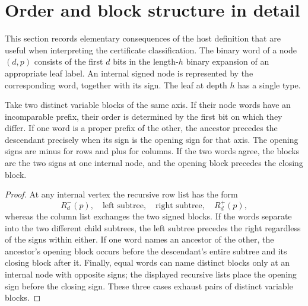 \section{Order and block structure in detail}\label{sec:structure}
This section records elementary consequences of the host definition
that are useful when interpreting the certificate classification.
The binary word of a node $(d,p)$ consists of the first $d$ bits in
the length-$h$ binary expansion of an appropriate leaf label.
An internal signed node is represented by the corresponding word,
together with its sign.  The leaf at depth $h$ has a single type.

\begin{lemma}\label{lem:wordorder}
Take two distinct variable blocks of the same axis. If their node
words have an incomparable prefix, their order is determined by the
first bit on which they differ. If one word is a proper prefix of
the other, the ancestor precedes the descendant precisely when its
sign is the opening sign for that axis. The opening signs are minus
for rows and plus for columns. If the two words agree, the blocks
are the two signs at one internal node, and the opening block precedes
the closing block.
\end{lemma}
\begin{proof}
At any internal vertex the recursive row list has the form
\[
 R_d^-(p),\quad \text{left subtree},\quad
 \text{right subtree},\quad R_d^+(p),
\]
whereas the column list exchanges the two signed blocks. If the
words separate into the two different child subtrees, the left
subtree precedes the right regardless of the signs within either.
If one word names an ancestor of the other, the ancestor's opening
block occurs before the descendant's entire subtree and its closing
block after it. Finally, equal words can name distinct blocks only
at an internal node with opposite signs; the displayed recursive
lists place the opening sign before the closing sign. These three
cases exhaust pairs of distinct variable blocks.
\end{proof}

